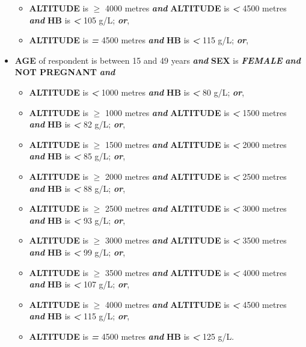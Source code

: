 \documentclass[12pt,a4paper]{article}
\begin{document}
\begin{itemize}
\begin{itemize}
  \item
    \textbf{ALTITUDE} is \textbf{\emph{\(\geq\)}} 4000 metres \textbf{\emph{and}} \textbf{ALTITUDE} is \textbf{\emph{\textless{}}} 4500 metres \textbf{\emph{and}} \textbf{HB} is \textbf{\emph{\textless{}}} 105 g/L; \textbf{\emph{or}},
  \item
    \textbf{ALTITUDE} is \textbf{\emph{=}} 4500 metres \textbf{\emph{and}} \textbf{HB} is \textbf{\emph{\textless{}}} 115 g/L; \textbf{\emph{or}},
  \end{itemize}
\item
  \textbf{AGE} of respondent is between 15 and 49 years \textbf{\emph{and}} \textbf{SEX} is \textbf{\emph{FEMALE}} \textbf{\emph{and}} \textbf{NOT PREGNANT} \textbf{\emph{and}}

  \begin{itemize}
  \item
    \textbf{ALTITUDE} is \textbf{\emph{\textless{}}} 1000 metres \textbf{\emph{and}} \textbf{HB} is \textbf{\emph{\textless{}}} 80 g/L; \textbf{\emph{or}},
  \item
    \textbf{ALTITUDE} is \textbf{\emph{\(\geq\)}} 1000 metres \textbf{\emph{and}} \textbf{ALTITUDE} is \textbf{\emph{\textless{}}} 1500 metres \textbf{\emph{and}} \textbf{HB} is \textbf{\emph{\textless{}}} 82 g/L; \textbf{\emph{or}},
  \item
    \textbf{ALTITUDE} is \textbf{\emph{\(\geq\)}} 1500 metres \textbf{\emph{and}} \textbf{ALTITUDE} is \textbf{\emph{\textless{}}} 2000 metres \textbf{\emph{and}} \textbf{HB} is \textbf{\emph{\textless{}}} 85 g/L; \textbf{\emph{or}},
  \item
    \textbf{ALTITUDE} is \textbf{\emph{\(\geq\)}} 2000 metres \textbf{\emph{and}} \textbf{ALTITUDE} is \textbf{\emph{\textless{}}} 2500 metres \textbf{\emph{and}} \textbf{HB} is \textbf{\emph{\textless{}}} 88 g/L; \textbf{\emph{or}},
  \item
    \textbf{ALTITUDE} is \textbf{\emph{\(\geq\)}} 2500 metres \textbf{\emph{and}} \textbf{ALTITUDE} is \textbf{\emph{\textless{}}} 3000 metres \textbf{\emph{and}} \textbf{HB} is \textbf{\emph{\textless{}}} 93 g/L; \textbf{\emph{or}},
  \item
    \textbf{ALTITUDE} is \textbf{\emph{\(\geq\)}} 3000 metres \textbf{\emph{and}} \textbf{ALTITUDE} is \textbf{\emph{\textless{}}} 3500 metres \textbf{\emph{and}} \textbf{HB} is \textbf{\emph{\textless{}}} 99 g/L; \textbf{\emph{or}},
  \item
    \textbf{ALTITUDE} is \textbf{\emph{\(\geq\)}} 3500 metres \textbf{\emph{and}} \textbf{ALTITUDE} is \textbf{\emph{\textless{}}} 4000 metres \textbf{\emph{and}} \textbf{HB} is \textbf{\emph{\textless{}}} 107 g/L; \textbf{\emph{or}},
  \item
    \textbf{ALTITUDE} is \textbf{\emph{\(\geq\)}} 4000 metres \textbf{\emph{and}} \textbf{ALTITUDE} is \textbf{\emph{\textless{}}} 4500 metres \textbf{\emph{and}} \textbf{HB} is \textbf{\emph{\textless{}}} 115 g/L; \textbf{\emph{or}},
  \item
    \textbf{ALTITUDE} is \textbf{\emph{=}} 4500 metres \textbf{\emph{and}} \textbf{HB} is \textbf{\emph{\textless{}}} 125 g/L.
  \end{itemize}
\end{itemize}
\end{document}
